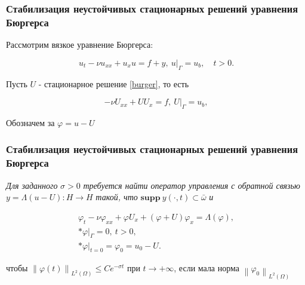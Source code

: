 \documentclass{beamer}
\newcommand{\norm}[1]{\left\lVert#1\right\rVert}
\begin{document}
\begin{frame}
    \frametitle{Стабилизация неустойчивых стационарных решений уравнения Бюргерса}

    Рассмотрим вязкое уравнение Бюргерса:
    \begin{block}{}

        \begin{equation}\label{burger}
            u_t - \nu u_{xx} + u_x u = f + y, \ u|_{\Gamma} = u_b, \quad t > 0.
        \end{equation}

    \end{block}

    Пусть $U$ - стационарное решение \eqref{burger}, то есть

    \begin{block}{}
        \begin{equation}\label{stationary_sol}
            -\nu U_{xx} + U U_x = f, \ U|_{\Gamma} = u_b,
        \end{equation}
    \end{block}

    Обозначем за $\varphi = u - U$

\end{frame}

\begin{frame}
    \frametitle{Стабилизация неустойчивых стационарных решений уравнения Бюргерса}
    \textit{Для заданного} $\sigma > 0$ 
    \textit{требуется найти оператор управления с обратной связью} 
    $y = \Lambda(u - U) : H \to H$ \textit{такой, что} $\mathbf{supp} \ y (\cdot,t) \subset 
    \bar{\omega}$ \textit{и}

    \begin{block}{}

        \begin{gather}\label{fluct}
            \varphi_t - \nu \varphi_{xx} + \varphi U_x + (\varphi + U)\varphi_x =
            \Lambda(\varphi),\\* 
            \varphi|_{\Gamma} = 0, \ t > 0,\\*
            \varphi|_{t = 0} = \varphi_0 = u_0 - U.
        \end{gather}
    \end{block}
    чтобы $\norm{\varphi(t)}_{L^2(\Omega)} \le C e^{-\sigma t}$ при $t \to
    +\infty$, если мала норма $\norm{\varphi_0}_{L^2(\Omega)}$

\end{frame}
\end{document}
